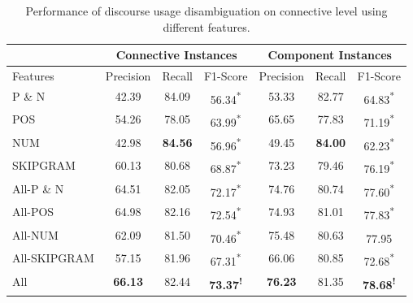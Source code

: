 \begin{table}[ht]
\centering
\begin{tabular}{|l|c|c|c|c|c|c|}
\hline
                & \multicolumn{3}{c|}{Connective Instances}                 & \multicolumn{3}{c|}{Component Instances}                      \\ \hline
Features        &     Precision &     Recall &     F1-Score                 &     Precision &     Recall &     F1-Score                     \\ \hline
P \& N          &     42.39     &     84.09  &     56.34\textsuperscript{*} &     53.33     &     82.77  &     64.83\textsuperscript{*}     \\ \hline
POS             &     54.26     &     78.05  &     63.99\textsuperscript{*} &     65.65     &     77.83  &     71.19\textsuperscript{*}     \\ \hline
NUM             &     42.98     & \bf 84.56  &     56.96\textsuperscript{*} &     49.45     & \bf 84.00  &     62.23\textsuperscript{*}     \\ \hline
SKIPGRAM        &     60.13     &     80.68  &     68.87\textsuperscript{*} &     73.23     &     79.46  &     76.19\textsuperscript{*}     \\ \hline
All-P \& N      &     64.51     &     82.05  &     72.17\textsuperscript{*} &     74.76     &     80.74  &     77.60\textsuperscript{*}     \\ \hline
All-POS         &     64.98     &     82.16  &     72.54\textsuperscript{*} &     74.93     &     81.01  &     77.83\textsuperscript{*}     \\ \hline
All-NUM         &     62.09     &     81.50  &     70.46\textsuperscript{*} &     75.48     &     80.63  &     77.95\textsuperscript{ }     \\ \hline
All-SKIPGRAM    &     57.15     &     81.96  &     67.31\textsuperscript{*} &     66.06     &     80.85  &     72.68\textsuperscript{*}     \\ \hline
All             & \bf 66.13     &     82.44  & \bf 73.37\textsuperscript{!} & \bf 76.23     &     81.35  & \bf 78.68\textsuperscript{!}     \\ \hline

\end{tabular}
\caption{\label{t:recognition-connective-features} Performance of discourse usage
disambiguation on connective level using different features. }
\end{table}
